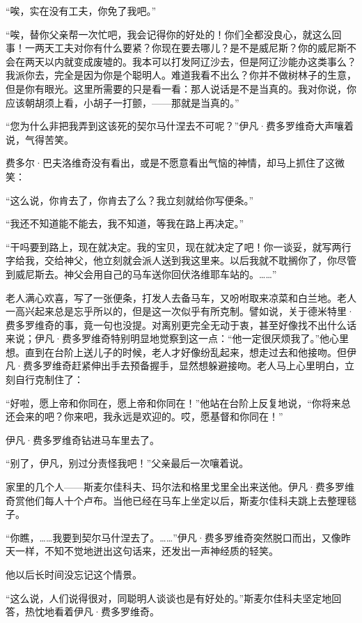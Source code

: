 \par “唉，实在没有工夫，你免了我吧。”
\par “唉，替你父亲帮一次忙吧，我会记得你的好处的！你们全都没良心，就这么回事！一两天工夫对你有什么要紧？你现在要去哪儿？是不是威尼斯？你的威尼斯不会在两天以内就变成废墟的。我本可以打发阿辽沙去，但是阿辽沙能办这类事么？我派你去，完全是因为你是个聪明人。难道我看不出么？你并不做树林子的生意，但是你有眼光。这里所需要的只是看一看：那人说话是不是当真的。我对你说，你应该朝胡须上看，小胡子一打颤，——那就是当真的。”
\par “您为什么非把我弄到这该死的契尔马什涅去不可呢？”伊凡·费多罗维奇大声嚷着说，气得苦笑。
\par 费多尔·巴夫洛维奇没有看出，或是不愿意看出气恼的神情，却马上抓住了这微笑：
\par “这么说，你肯去了，你肯去了么？我立刻就给你写便条。”
\par “我还不知道能不能去，我不知道，等我在路上再决定。”
\par “干吗要到路上，现在就决定。我的宝贝，现在就决定了吧！你一谈妥，就写两行字给我，交给神父，他立刻就会派人送到我这里来。以后我就不耽搁你了，你尽管到威尼斯去。神父会用自己的马车送你回伏洛维耶车站的。……”
\par 老人满心欢喜，写了一张便条，打发人去备马车，又吩咐取来凉菜和白兰地。老人一高兴起来总是忘乎所以的，但是这一次似乎有所克制。譬如说，关于德米特里·费多罗维奇的事，竟一句也没提。对离别更完全无动于衷，甚至好像找不出什么话来说；伊凡·费多罗维奇特别明显地觉察到这一点：“他一定很厌烦我了。”他心里想。直到在台阶上送儿子的时候，老人才好像纷乱起来，想走过去和他接吻。但伊凡·费多罗维奇赶紧伸出手去预备握手，显然想躲避接吻。老人马上心里明白，立刻自行克制住了：
\par “好啦，愿上帝和你同在，愿上帝和你同在！”他站在台阶上反复地说，“你将来总还会来的吧？你来吧，我永远是欢迎的。哎，愿基督和你同在！”
\par 伊凡·费多罗维奇钻进马车里去了。
\par “别了，伊凡，别过分责怪我吧！”父亲最后一次嚷着说。
\par 家里的几个人——斯麦尔佳科夫、玛尔法和格里戈里全出来送他。伊凡·费多罗维奇赏他们每人十个卢布。当他已经在马车上坐定以后，斯麦尔佳科夫跳上去整理毯子。
\par “你瞧，……我要到契尔马什涅去了。……”伊凡·费多罗维奇突然脱口而出，又像昨天一样，不知不觉地迸出这句话来，还发出一声神经质的轻笑。
\par 他以后长时间没忘记这个情景。
\par “这么说，人们说得很对，同聪明人谈谈也是有好处的。”斯麦尔佳科夫坚定地回答，热忱地看着伊凡·费多罗维奇。
